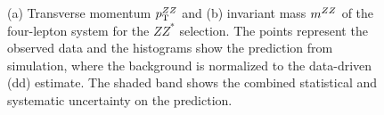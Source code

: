\begin{figure}[htbp]
 \begin{center}
\caption{\label{fig:kindists_zzs}(a) Transverse momentum $p_{\mathrm{T}}^{ZZ}$ and (b) invariant mass $m^{ZZ}$ of the
           four-lepton system for the $ZZ^{*}$ selection. The points represent the observed data and the 
           histograms show the prediction from simulation, where the background
           is normalized to the data-driven (dd) estimate. 
           The shaded band 
           shows the combined statistical and systematic uncertainty on the prediction. 
}
\end{center}
\end{figure}

